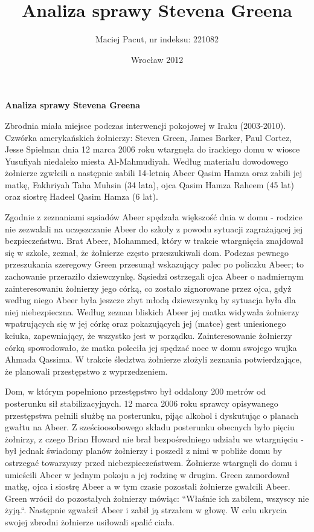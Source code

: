 \documentclass[12pt,a4paper]{article}
\title{Analiza sprawy Stevena Greena}
\author{Maciej Pacut, nr indeksu: 221082}
\date{Wrocław 2012}
\begin{document}
\begin{center}
\LARGE{\textbf{Analiza sprawy Stevena Greena}}
\end{center}

Zbrodnia miała miejsce podczas interwencji pokojowej w Iraku
(2003-2010). Czwórka amerykańskich żołnierzy: Steven Green, James
Barker, Paul Cortez, Jesse Spielman dnia 12 marca 2006 roku wtargnęła
do irackiego domu w wiosce Yusufiyah niedaleko miesta Al-Mahmudiyah.
Według materiału dowodowego żołnierze zgwłcili a następnie zabili
14-letnią Abeer Qasim Hamza oraz zabili jej matkę, Fakhriyah Taha
Muhsin (34 lata), ojca Qasim Hamza Raheem (45 lat) oraz siostrę Hadeel
Qasim Hamza (6 lat).


Zgodnie z zeznaniami sąsiadów Abeer spędzała większość dnia w domu -
rodzice nie zezwalali na uczęszczanie Abeer do szkoły z powodu sytuacji
zagrażającej jej bezpieczeństwu. Brat Abeer, Mohammed, który w trakcie wtargnięcia
znajdował się w szkole, zeznał, że żołnierze często przeszukiwali dom.
Podczas pewnego przeszukania szeregowy Green przesunął wskazujący
palec po policzku Abeer; to zachowanie przeraziło dziewczynkę. Sąsiedzi
ostrzegali ojca Abeer o nadmiernym zainteresowaniu żołnierzy jego
córką, co zostało zignorowane przez ojca, gdyż według niego Abeer była
jeszcze zbyt młodą dziewczynką by sytuacja była dla niej
niebezpieczna. Według zeznan bliskich Abeer jej matka widywała
żołnierzy wpatrujących się w jej córkę oraz pokazujących jej (matce)
gest uniesionego kciuka, zapewniający, że wszystko jest w porządku.
Zainteresowanie żołnierzy córką spowodowało, że matka poleciła jej
spędzać noce w domu swojego wujka Ahmada Qassima. W trakcie śledztwa
żołnierze złożyli zeznania potwierdzające, że planowali przestępstwo z
wyprzedzeniem.


Dom, w którym popełniono przestępstwo był oddalony 200 metrów od
posterunku sił stabilizacyjnych. 12 marca 2006 roku sprawcy
opisywanego przestępstwa pełnili służbę na posterunku, pijąc alkohol i
dyskutując o planach gwałtu na Abeer. Z sześcioosobowego składu
posterunku obecnych było pięciu żołnirzy, z czego Brian Howard nie
brał bezpośredniego udziału we wtargnięciu - był jednak świadomy
planów żołnierzy i poszedł z nimi w pobliże domu by ostrzegać
towarzyszy przed niebezpieczeństwem. Żołnierze wtargnęli do domu i
umieścili Abeer w jednym pokoju a jej rodzinę w drugim. Green
zamordował matkę, ojca i siostrę Abeer a w tym czasie pozostali
żołnierze gwałcili Abeer. Green wrócił do pozostałych żołnierzy
mówiąc: ``Właśnie ich zabiłem, wszyscy nie żyją.``. Następnie zgwałcił
Abeer i zabił ją strzałem w głowę. W celu ukrycia swojej zbrodni
żołnierze usiłowali spalić ciała.
\end{document}
